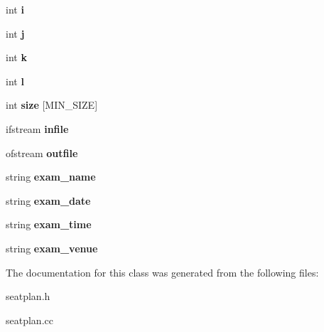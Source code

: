 \begin{DoxyCompactItemize}
\item 
\hypertarget{classSeatPlan_aa58731f5bc8a2e44ada7d0f51fc7a58f}{int {\bfseries i}}\label{classSeatPlan_aa58731f5bc8a2e44ada7d0f51fc7a58f}

\item 
\hypertarget{classSeatPlan_ae0d1fd49d01dd90160c5168fc6af41f7}{int {\bfseries j}}\label{classSeatPlan_ae0d1fd49d01dd90160c5168fc6af41f7}

\item 
\hypertarget{classSeatPlan_ab9f49d7c490fb81c6e3a1bad983e4956}{int {\bfseries k}}\label{classSeatPlan_ab9f49d7c490fb81c6e3a1bad983e4956}

\item 
\hypertarget{classSeatPlan_ad3a251bd1922b26e4c0297ae41704656}{int {\bfseries l}}\label{classSeatPlan_ad3a251bd1922b26e4c0297ae41704656}

\item 
\hypertarget{classSeatPlan_a83512de0480711b6c205fc5ed71891d1}{int {\bfseries size} \mbox{[}M\-I\-N\-\_\-\-S\-I\-Z\-E\mbox{]}}\label{classSeatPlan_a83512de0480711b6c205fc5ed71891d1}

\item 
\hypertarget{classSeatPlan_aba400a97d6ed6d615069106ec5db7dc4}{ifstream {\bfseries infile}}\label{classSeatPlan_aba400a97d6ed6d615069106ec5db7dc4}

\item 
\hypertarget{classSeatPlan_a6421c8e8a3a6c56619c4cef8108eca68}{ofstream {\bfseries outfile}}\label{classSeatPlan_a6421c8e8a3a6c56619c4cef8108eca68}

\item 
\hypertarget{classSeatPlan_a2ccc7b524acd261f6dbc19ec57a8c293}{string {\bfseries exam\-\_\-name}}\label{classSeatPlan_a2ccc7b524acd261f6dbc19ec57a8c293}

\item 
\hypertarget{classSeatPlan_a759e103a450eb0fce269b1d99a2beb3d}{string {\bfseries exam\-\_\-date}}\label{classSeatPlan_a759e103a450eb0fce269b1d99a2beb3d}

\item 
\hypertarget{classSeatPlan_a7a1b5a1057a3cd51567f4945a6eef5fc}{string {\bfseries exam\-\_\-time}}\label{classSeatPlan_a7a1b5a1057a3cd51567f4945a6eef5fc}

\item 
\hypertarget{classSeatPlan_a4e623288bfd7887069f69fdf8d233d76}{string {\bfseries exam\-\_\-venue}}\label{classSeatPlan_a4e623288bfd7887069f69fdf8d233d76}

\end{DoxyCompactItemize}


The documentation for this class was generated from the following files\-:\begin{DoxyCompactItemize}
\item 
seatplan.\-h\item 
seatplan.\-cc\end{DoxyCompactItemize}
